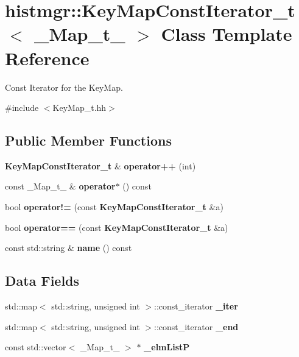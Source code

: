 \section{histmgr::KeyMapConstIterator\_\-t$<$ \_\-Map\_\-t\_\- $>$ Class Template Reference}
\label{classhistmgr_1_1KeyMapConstIterator__t}


Const Iterator for the KeyMap.  


{\ttfamily \#include $<$KeyMap\_\-t.hh$>$}\subsection*{Public Member Functions}
\begin{DoxyCompactItemize}
\item 
{\bf KeyMapConstIterator\_\-t} \& {\bfseries operator++} (int)\label{classhistmgr_1_1KeyMapConstIterator__t_a836ba25c49adada842fbae460c128324}

\item 
const \_\-Map\_\-t\_\- \& {\bfseries operator$\ast$} () const \label{classhistmgr_1_1KeyMapConstIterator__t_ab5b2ed2dd09f955fac73a81ea946a279}

\item 
bool {\bfseries operator!=} (const {\bf KeyMapConstIterator\_\-t} \&a)\label{classhistmgr_1_1KeyMapConstIterator__t_a6287d9b0a5a0416e7fb7148b4e7c8d50}

\item 
bool {\bfseries operator==} (const {\bf KeyMapConstIterator\_\-t} \&a)\label{classhistmgr_1_1KeyMapConstIterator__t_a1d8772a655ce9206fc4ca55ec1180d10}

\item 
const std::string \& {\bfseries name} () const \label{classhistmgr_1_1KeyMapConstIterator__t_a177a0274749f6e1886bc635f710ee8ab}

\end{DoxyCompactItemize}
\subsection*{Data Fields}
\begin{DoxyCompactItemize}
\item 
std::map$<$ std::string, unsigned int $>$::const\_\-iterator {\bfseries \_\-iter}\label{classhistmgr_1_1KeyMapConstIterator__t_a80de00a5a879add47244319e194c550a}

\item 
std::map$<$ std::string, unsigned int $>$::const\_\-iterator {\bfseries \_\-end}\label{classhistmgr_1_1KeyMapConstIterator__t_a83ae501c29ac9a9f7fcd51d9971a9fb1}

\item 
const std::vector$<$ \_\-Map\_\-t\_\- $>$ $\ast$ {\bfseries \_\-elmListP}\label{classhistmgr_1_1KeyMapConstIterator__t_ae70832f44812b9a959ae5213f46228bf}

\end{DoxyCompactItemize}

